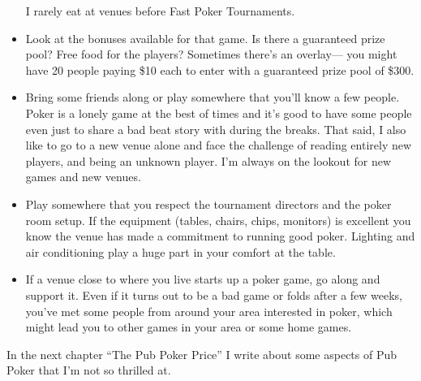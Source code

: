 \begin{itemize}
I rarely eat at venues before Fast Poker Tournaments.


\item Look at the bonuses available for that game. Is there a
guaranteed prize pool? Free food for the players? Sometimes
there's an overlay--- you might have 20 people paying \$10 each
to enter with a guaranteed prize pool of \$300.


\item Bring some friends along or play somewhere that you'll
know a few people. Poker is a lonely game at the best
of times and it's good to have some people even just to share
a bad beat story with during the breaks. That said, I also like
to go to a new venue alone and face the challenge of
reading entirely new players, and being an unknown player.
I'm always on the lookout for new games and new venues.

\item Play somewhere that you respect the tournament directors
and the poker room setup. If the equipment (tables, chairs, chips,
monitors) is excellent you know the venue has made a commitment
to running good poker. Lighting and air conditioning
play a huge part in your comfort at the table.

\item If a venue close to where you live starts
up a poker game, go along and support it. Even if it turns out to
be a bad game or folds after a few weeks, you've met some people
from around your area interested in poker, which might lead
you to other games in your area or some home games.

\end{itemize}

In the next chapter ``The Pub Poker Price'' I write about some
aspects of Pub Poker that I'm not so thrilled at.
